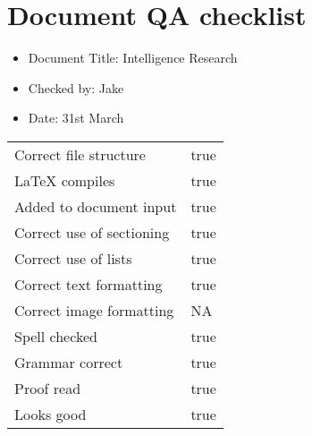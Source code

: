 \documentclass[14pt]{article}
\begin{document}
\section*{Document QA checklist}
\Large
\begin{itemize}
\item Document Title: Intelligence Research
\item Checked by: Jake
\item Date: 31st March
\end{itemize}
\Large
\begin{tabularx}{\textwidth}{ X | X }
Correct file structure &  true\\
\LaTeX \hspace{4pt} compiles & true\\
Added to document input & true\\
Correct use of sectioning & true\\
Correct use of lists & true\\
Correct text formatting & true\\
Correct image formatting & NA\\
Spell checked & true\\
Grammar correct & true\\
Proof read & true\\
Looks good & true\\
\end{tabularx}
\end{document}
